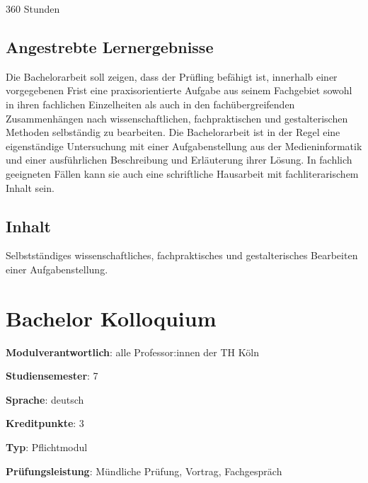 360 Stunden

\hypertarget{angestrebte-lernergebnissepathlabel....srcmodulbeschreibungen-bachelor-bpo5ba_bachelorarbeit}{%
\section*{Angestrebte
Lernergebnisse\label{../../src/modulbeschreibungen-bachelor-bpo5/BA_Bachelorarbeit}}\label{angestrebte-lernergebnissepathlabel....srcmodulbeschreibungen-bachelor-bpo5ba_bachelorarbeit}}

Die Bachelorarbeit soll zeigen, dass der Prüfling befähigt ist,
innerhalb einer vorgegebenen Frist eine praxisorientierte Aufgabe aus
seinem Fachgebiet sowohl in ihren fachlichen Einzelheiten als auch in
den fachübergreifenden Zusammenhängen nach wissenschaftlichen,
fachpraktischen und gestalterischen Methoden selbständig zu bearbeiten.
Die Bachelorarbeit ist in der Regel eine eigenständige Untersuchung mit
einer Aufgabenstellung aus der Medieninformatik und einer ausführlichen
Beschreibung und Erläuterung ihrer Lösung. In fachlich geeigneten Fällen
kann sie auch eine schriftliche Hausarbeit mit fachliterarischem Inhalt
sein.

\hypertarget{inhaltpathlabel....srcmodulbeschreibungen-bachelor-bpo5ba_bachelorarbeit}{%
\section*{Inhalt\label{../../src/modulbeschreibungen-bachelor-bpo5/BA_Bachelorarbeit}}\label{inhaltpathlabel....srcmodulbeschreibungen-bachelor-bpo5ba_bachelorarbeit}}

Selbstständiges wissenschaftliches, fachpraktisches und gestalterisches
Bearbeiten einer Aufgabenstellung.

\hypertarget{bachelor-kolloquiumpathlabel....srcmodulbeschreibungen-bachelor-bpo5ba_bachelorkolloquium}{%
\chapter{Bachelor
Kolloquium\label{../../src/modulbeschreibungen-bachelor-bpo5/BA_Bachelorkolloquium}}\label{bachelor-kolloquiumpathlabel....srcmodulbeschreibungen-bachelor-bpo5ba_bachelorkolloquium}}

\begin{modulHead}
\textbf{Modulverantwortlich}: alle Professor:innen
der TH Köln
\end{modulHead}
\begin{modulHead}
\textbf{Studiensemester}:
7
\end{modulHead}
\begin{modulHead}
\textbf{Sprache}:
deutsch
\end{modulHead}
\begin{modulHead}
\textbf{Kreditpunkte}:
3
\end{modulHead}
\begin{modulHead}
\textbf{Typ}:
Pflichtmodul
\end{modulHead}
\begin{modulHead}
\textbf{Prüfungsleistung}:
Mündliche Prüfung, Vortrag, Fachgespräch
\end{modulHead}


